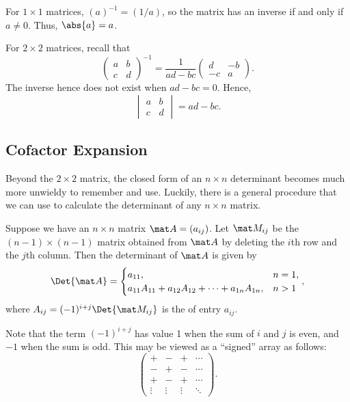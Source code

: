 For $1 \times 1$ matrices, $(a)^{-1} = (1/a)$, so the matrix has an inverse if and only if $a \neq 0$. Thus, $\abs{a} = a$.

For $2 \times 2$ matrices, recall that \[\begin{pmatrix}a & b \\ c & d\end{pmatrix}^{-1} = \frac1{ad - bc} \begin{pmatrix}d & -b \\ -c & a\end{pmatrix}.\] The inverse hence does not exist when $ad - bc = 0$. Hence, \[\begin{vmatrix}a & b \\ c& d\end{vmatrix} = ad - bc.\]

\subsection{Cofactor Expansion}

Beyond the $2 \times 2$ matrix, the closed form of an $n \times n$ determinant becomes much more unwieldy to remember and use. Luckily, there is a general procedure that we can use to calculate the determinant of any $n \times n$ matrix.

\begin{proposition}\label{prop:cofactor}
    Suppose we have an $n \times n$ matrix $\mat A = (a_{ij})$. Let $\mat M_{ij}$ be the $(n-1) \times (n-1)$ matrix obtained from $\mat A$ by deleting the $i$th row and the $j$th column. Then the determinant of $\mat A$ is given by \[\Det{\mat A} = \begin{cases}
        a_{11}, & n = 1,\\
        a_{11} A_{11} + a_{12} A_{12} + \dots + a_{1n} A_{1n}, & n > 1
    \end{cases},\] where $A_{ij} = (-1)^{i+j} \Det{\mat M_{ij}}$ is the  of entry $a_{ij}$.
\end{proposition}

Note that the term $(-1)^{i+j}$ has value 1 when the sum of $i$ and $j$ is even, and $-1$ when the sum is odd. This may be viewed as a ``signed'' array as follows: \[\begin{pmatrix}+ & - & + & \cdots \\ - & + & - & \cdots \\ + & - & + & \cdots \\ \vdots & \vdots & \vdots & \ddots \end{pmatrix}.\]

